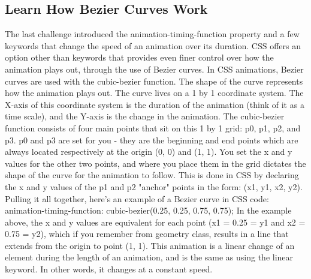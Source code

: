 \documentclass{article}%
\begin{document}
%
\subsection{Learn How Bezier Curves Work}%
\label{subsec:LearnHowBezierCurvesWork}%
The last challenge introduced the animation{-}timing{-}function property and a few keywords that change the speed of an animation over its duration. CSS offers an option other than keywords that provides even finer control over how the animation plays out, through the use of Bezier curves.\newline%
In CSS animations, Bezier curves are used with the cubic{-}bezier function. The shape of the curve represents how the animation plays out. The curve lives on a 1 by 1 coordinate system. The X{-}axis of this coordinate system is the duration of the animation (think of it as a time scale), and the Y{-}axis is the change in the animation.\newline%
The cubic{-}bezier function consists of four main points that sit on this 1 by 1 grid: p0, p1, p2, and p3. p0 and p3 are set for you {-} they are the beginning and end points which are always located respectively at the origin (0, 0) and (1, 1). You set the x and y values for the other two points, and where you place them in the grid dictates the shape of the curve for the animation to follow. This is done in CSS by declaring the x and y values of the p1 and p2 "anchor" points in the form: (x1, y1, x2, y2). Pulling it all together, here's an example of a Bezier curve in CSS code:\newline%
animation{-}timing{-}function: cubic{-}bezier(0.25, 0.25, 0.75, 0.75);\newline%
In the example above, the x and y values are equivalent for each point (x1 = 0.25 = y1 and x2 = 0.75 = y2), which if you remember from geometry class, results in a line that extends from the origin to point (1, 1). This animation is a linear change of an element during the length of an animation, and is the same as using the linear keyword. In other words, it changes at a constant speed.\newline%

%
\end{document}
